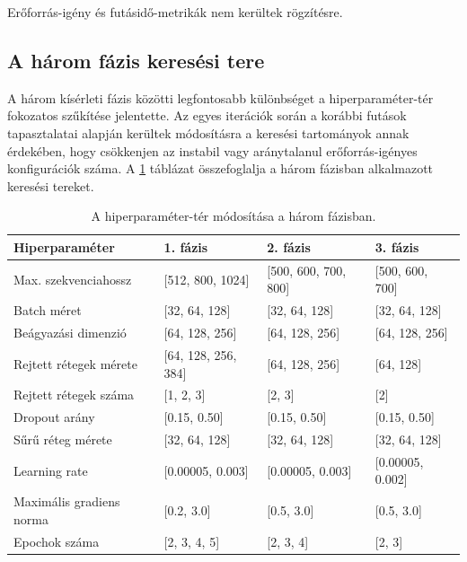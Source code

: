 Erőforrás-igény és futásidő-metrikák nem kerültek rögzítésre.

\subsection{A három fázis keresési tere}

A három kísérleti fázis közötti legfontosabb különbséget a hiperparaméter-tér fokozatos szűkítése jelentette.
Az egyes iterációk során a korábbi futások tapasztalatai alapján kerültek módosításra a keresési tartományok annak érdekében, hogy csökkenjen az instabil vagy aránytalanul erőforrás-igényes konfigurációk száma.
A \ref{tab:search-space-phases} táblázat összefoglalja a három fázisban alkalmazott keresési tereket.

\begin{table}[htbp]
    \centering
    \caption{A hiperparaméter-tér módosítása a három fázisban.}
    \label{tab:search-space-phases}
    \begin{tabular}{|l|l|l|l|}
        \hline
        \textbf{Hiperparaméter} & \textbf{1. fázis} & \textbf{2. fázis} & \textbf{3. fázis} \\
        \hline
        Max. szekvenciahossz & [512, 800, 1024] & [500, 600, 700, 800] & [500, 600, 700] \\
        \hline
        Batch méret & [32, 64, 128] & [32, 64, 128] & [32, 64, 128] \\
        \hline
        Beágyazási dimenzió & [64, 128, 256] & [64, 128, 256] & [64, 128, 256] \\
        \hline
        Rejtett rétegek mérete & [64, 128, 256, 384] & [64, 128, 256] & [64, 128] \\
        \hline
        Rejtett rétegek száma & [1, 2, 3] & [2, 3] & [2] \\
        \hline
        Dropout arány & [0.15, 0.50] & [0.15, 0.50] & [0.15, 0.50] \\
        \hline
        Sűrű réteg mérete & [32, 64, 128] & [32, 64, 128] & [32, 64, 128] \\
        \hline
        Learning rate & [0.00005, 0.003] & [0.00005, 0.003] & [0.00005, 0.002] \\
        \hline
        Maximális gradiens norma & [0.2, 3.0] & [0.5, 3.0] & [0.5, 3.0] \\
        \hline
        Epochok száma & [2, 3, 4, 5] & [2, 3, 4] & [2, 3] \\
        \hline
    \end{tabular}
\end{table}

